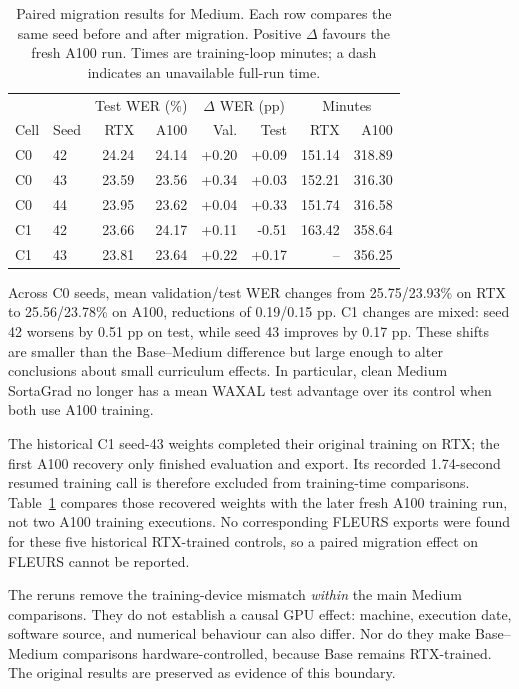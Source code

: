 \documentclass[12pt,a4paper]{report}
\begin{document}
\begin{table}[htbp]\centering\small
\caption{Paired migration results for Medium. Each row compares the same seed
before and after migration. Positive $\Delta$ favours the fresh A100 run.
Times are training-loop minutes; a dash indicates an unavailable full-run time.}
\label{tab:migration}
\setlength{\tabcolsep}{4pt}
\begin{tabular}{llrrrrrr}\toprule
 & & \multicolumn{2}{c}{Test WER (\%)} & \multicolumn{2}{c}{$\Delta$ WER (pp)} & \multicolumn{2}{c}{Minutes}\\
Cell & Seed & RTX & A100 & Val. & Test & RTX & A100\\\midrule
C0 & 42 & 24.24 & 24.14 & +0.20 & +0.09 & 151.14 & 318.89 \\
C0 & 43 & 23.59 & 23.56 & +0.34 & +0.03 & 152.21 & 316.30 \\
C0 & 44 & 23.95 & 23.62 & +0.04 & +0.33 & 151.74 & 316.58 \\
C1 & 42 & 23.66 & 24.17 & +0.11 & -0.51 & 163.42 & 358.64 \\
C1 & 43 & 23.81 & 23.64 & +0.22 & +0.17 & -- & 356.25 \\
\bottomrule\end{tabular}\end{table}

Across C0 seeds, mean validation/test WER changes from 25.75/23.93\% on RTX
to 25.56/23.78\% on A100, reductions of 0.19/0.15 pp. C1 changes are mixed:
seed 42 worsens by 0.51 pp on test, while seed 43 improves by 0.17 pp.
These shifts are smaller than the Base--Medium difference but large enough
to alter conclusions about small curriculum effects. In particular, clean
Medium SortaGrad no longer has a mean WAXAL test advantage over its control
when both use A100 training.

The historical C1 seed-43 weights completed their original training on RTX;
the first A100 recovery only finished evaluation and export. Its recorded
1.74-second resumed training call is therefore excluded from training-time
comparisons. Table~\ref{tab:migration} compares those recovered weights with
the later fresh A100 training run, not two A100 training executions. No
corresponding FLEURS exports were found for these five historical RTX-trained
controls, so a paired migration effect on FLEURS cannot be reported.

The reruns remove the training-device mismatch \emph{within} the main Medium
comparisons. They do not establish a causal GPU effect: machine, execution
date, software source, and numerical behaviour can also differ. Nor do they
make Base--Medium comparisons hardware-controlled, because Base remains
RTX-trained. The original results are preserved as evidence of this boundary.
\end{document}
